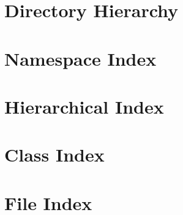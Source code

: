 \documentclass[twoside]{book}
\newcommand{\+}{\discretionary{\mbox{\scriptsize$\hookleftarrow$}}{}{}}
\begin{document}


























\chapter{Directory Hierarchy}

\chapter{Namespace Index}

\chapter{Hierarchical Index}

\chapter{Class Index}

\chapter{File Index}

\end{document}
